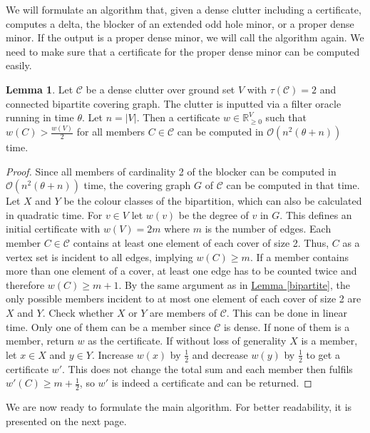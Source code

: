 \documentclass[a4paper, 12pt]{scrbook}
\theoremstyle{definition}
\newtheorem{lemma}[theorem]{Lemma}
\newcommand*{\IR}{\ensuremath{\mathbb{R}}}
\begin{document}
   We will formulate an algorithm that, given a dense clutter including a certificate, computes a delta, the blocker of an extended odd hole minor, or a proper dense minor. If the output is a proper dense minor, we will call the algorithm again. We need to make sure that a certificate for the proper dense minor can be computed easily.

   \begin{lemma}\label{computecert}
       Let $\mathcal{C}$ be a dense clutter over ground set $V$ with $\tau(\mathcal{C})=2$ and connected bipartite covering graph. The clutter is inputted via a filter oracle running in time $\theta$. Let $n=|V|$. Then a certificate $w \in \IR^V_{\geq 0}$ such that $w(C)>\frac{w(V)}{2}$ for all members $C \in \mathcal{C}$ can be computed in $\mathcal{O}(n^2(\theta+n))$ time.
   \end{lemma}

   \begin{proof}
       Since all members of cardinality 2 of the blocker can be computed in $\mathcal{O}(n^2(\theta+n))$ time, the covering graph $G$ of $\mathcal{C}$ can be computed in that time.
       Let $X$ and $Y$ be the colour classes of the bipartition, which can also be calculated in quadratic time.
       For $v \in V$ let $w(v)$ be the degree of $v$ in $G$. This defines an initial certificate with $w(V) = 2m$ where $m$ is the number of edges.
       Each member $C \in \mathcal{C}$ contains at least one element of each cover of size 2. Thus, $C$ as a vertex set is incident to all edges, implying $w(C) \geq m$.
       If a member contains more than one element of a cover, at least one edge has to be counted twice and therefore $w(C) \geq m+1$.
       By the same argument as in \hyperref[bipartite]{Lemma \ref*{bipartite}}, the only possible members incident to at most one element of each cover of size 2 are $X$ and $Y$.
       Check whether $X$ or $Y$ are members of $\mathcal{C}$. This can be done in linear time.
       Only one of them can be a member since $\mathcal{C}$ is dense.
       If none of them is a member, return $w$ as the certificate.
       If without loss of generality $X$ is a member, let $x \in X$ and $y \in Y$.
       Increase $w(x)$ by $\frac 12$ and decrease $w(y)$ by $\frac 12$ to get a certificate $w'$.
       This does not change the total sum and each member then fulfils $w'(C) \geq m + \frac 12$, so $w'$ is indeed a certificate and can be returned.
   \end{proof}
   We are now ready to formulate the main algorithm.
   For better readability, it is presented on the next page.
   \clearpage
\end{document}
